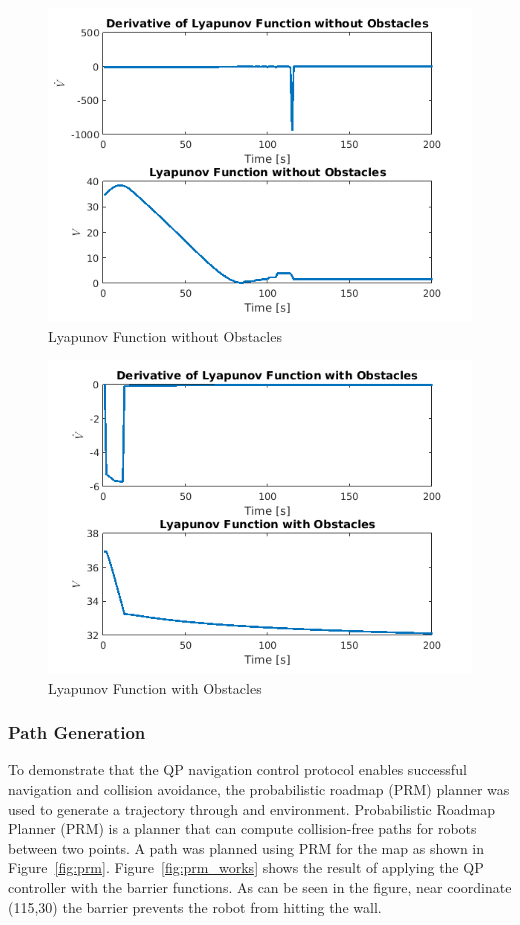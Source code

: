 \documentclass[journal]{IEEEtran}
\begin{document}
\begin{figure}[h!]
\centering
\includegraphics[scale=0.63]{vsans1.png} 
\caption{Lyapunov Function without Obstacles\label{fig:lyapunovsans}} 
\end{figure}

\begin{figure}[h!]
\centering
\includegraphics[scale=0.63]{v2.png} 
\caption{Lyapunov Function with Obstacles\label{fig:lyapunov}} 
\end{figure}
 \fi

\subsubsection{Path Generation}
To demonstrate that the QP navigation control protocol enables successful navigation and collision avoidance, the probabilistic roadmap (PRM) planner was used to generate a trajectory through and environment. Probabilistic Roadmap Planner (PRM) is a planner that can compute collision-free paths for robots between two points. A path was planned using PRM for the map as shown in Figure~\ref{fig:prm}.  Figure~\ref{fig:prm_works} shows the result of applying the QP controller with the barrier functions. As can be seen in the figure, near coordinate (115,30) the barrier prevents the robot from hitting the wall. 
\end{document}
